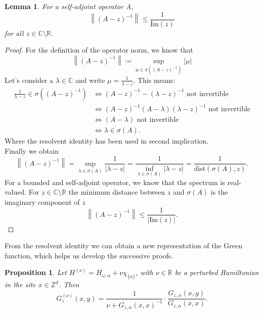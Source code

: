 \documentclass[11pt, a4paper, UKenglish, oneside]{book}
\theoremstyle{plain}
\newtheorem{proposition}[theorem]{Proposition}
\newtheorem{lemma}[theorem]{Lemma}
\theoremstyle{remark}
\theoremstyle{definition}
\numberwithin{equation}{section}
\numberwithin{theorem}{section}
\begin{document}
\begin{lemma} \label{lemma:1/imz}
    For a self-adjoint operator A,
    \begin{equation}
        \left\| (A-z)^{-1} \right\| \le \frac{1}{\mathrm{Im}(z)}
    \end{equation}
    for all $ z \in \mathbb{C} \setminus \mathbb{R}$.
\end{lemma}
\begin{proof}
    For the definition of the operator norm, we know that 
    \[
    \left\|(A-z)^{-1}\right\| \coloneqq \sup_{ \mu \in \sigma((A-z)^{-1})} |\mu|
    \]
    Let's consider a $ \lambda \in \mathbb{C}$ and write $ \mu = \frac{1}{\lambda -z}$. This means:
    \begin{align*}
    \frac{1}{\lambda-z} \in \sigma((A-z)^{-1}) &\iff (A-z)^{-1} - (\lambda-z)^{-1} \text{ not invertible} \\
    &\iff (A-z)^{-1} (A-\lambda)(\lambda-z)^{-1} \text{ not invertible} \\
    &\iff (A- \lambda) \text{ not invertible} \\
    &\iff \lambda \in \sigma(A).
    \end{align*}
    Where the resolvent identity has been used in second implication.\\
    Finally we obtain 
    \[
    \left\|(A-z)^{-1}\right\| = \sup_{ \lambda \in \sigma(A)} \frac{1}{|\lambda -z|} = \frac{1}{\inf_{\lambda \in \sigma(A)} |\lambda-z|} = \frac{1}{\text{dist}(\sigma(A),z)}.
    \]
    For a bounded and self-adjoint operator, we know that the spectrum is real-valued. For $ z \in \mathbb{C} \setminus \mathbb{R} $ the minimum distance between $ z$ and $ \sigma(A)$ is the imaginary component of $z$\\
    \begin{equation}
        \left\|(A-z)^{-1}\right\| \le \frac{1}{|\mathrm{Im}(z)|}.
    \end{equation}
    
    
    
\end{proof}
From the resolvent identity we can obtain a new representation of the Green function, which helps us develop the successive proofs.
\begin{proposition}\label{prop:useofresolventidentity}
    Let $H^{(\nu)} = H_{\omega,\alpha} + \nu \chi_{\{x\}}$, with $\nu \in \mathbb{R}$ be a perturbed Hamiltonian in the site $x \in \mathbb{Z}^d$. Then 
    \begin{equation}
            G^{(\nu)}_z(x,y) = \frac{1}{\nu + G_{z,\alpha}(x,x)^{-1}} \cdot \frac{G_{z,\alpha}(x,y)}{G_{z,\alpha}(x,x)}. \label{eq:4.12}  
    \end{equation}
\end{proposition}
\end{document}
